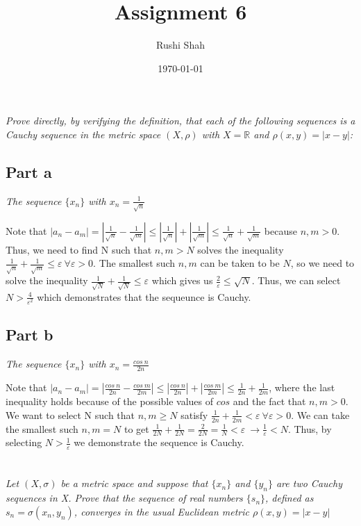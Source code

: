 \documentclass[]{article}
\author{Rushi Shah}
\date{\today}
\title{Assignment 6}
\newcommand{\reals}{\mathbb{R}}
\begin{document}
	\maketitle

	\section{}
		\textit{Prove directly, by verifying the definition, that each of the following sequences is a Cauchy sequence in the metric space $(X, \rho)$ with $X = \reals$ and $\rho(x, y) = |x - y|$:}

		\subsection*{Part a}
		\textit{The sequence $\{x_n\}$ with $x_n = \frac{1}{\sqrt{n}}$}

		Note that $|a_n - a_m| = |\frac{1}{\sqrt{n}} - \frac{1}{\sqrt{m}}| \leq |\frac{1}{\sqrt{n}}| + |\frac{1}{\sqrt{m}}| \leq \frac{1}{\sqrt{n}} + \frac{1}{\sqrt{m}}$ because $n, m > 0$. Thus, we need to find N such that $n, m > N$ solves the inequality $\frac{1}{\sqrt{n}} + \frac{1}{\sqrt{m}} \leq \varepsilon\ \forall \varepsilon > 0$. The smallest such $n, m$ can be taken to be $N$, so we need to solve the inequality $\frac{1}{\sqrt{N}} + \frac{1}{\sqrt{N}} \leq \varepsilon$ which gives us $\frac{2}{\varepsilon} \leq \sqrt{N}$. Thus, we can select $N > \frac{4}{\varepsilon^2}$ which demonstrates that the sequeunce is Cauchy. 

		\subsection*{Part b}
		\textit{The sequence $\{x_n\}$ with $x_n = \frac{cos\ n}{2n}$}

		Note that $|a_n - a_m| = |\frac{cos\ n}{2n} - \frac{cos\ m}{2m}| \leq |\frac{cos\ n}{2n}| + |\frac{cos\ m}{2m}| \leq \frac{1}{2n} + \frac{1}{2m}$, where the last inequality holds because of the possible values of $cos$ and the fact that $n, m > 0$. We want to select N such that $n, m \geq N$ satisfy $\frac{1}{2n} + \frac{1}{2m} < \varepsilon\ \forall \varepsilon > 0$. We can take the smallest such $n, m = N$ to get $\frac{1}{2N} + \frac{1}{2N}  = \frac{2}{2N} = \frac{1}{N} < \varepsilon\ \to \frac{1}{\varepsilon} < N$. Thus, by selecting $N > \frac{1}{\varepsilon}$ we demonstrate the sequence is Cauchy. 

	\section{}
		\textit{Let $(X, \sigma)$ be a metric space and suppose that $\{x_n\}$ and $\{y_n\}$ are two Cauchy sequences in X. Prove that the sequence of real numbers $\{s_n\}$, defined as $s_n = \sigma(x_n, y_n)$, converges in the usual Euclidean metric $\rho(x, y) = |x - y|$}
\end{document}
